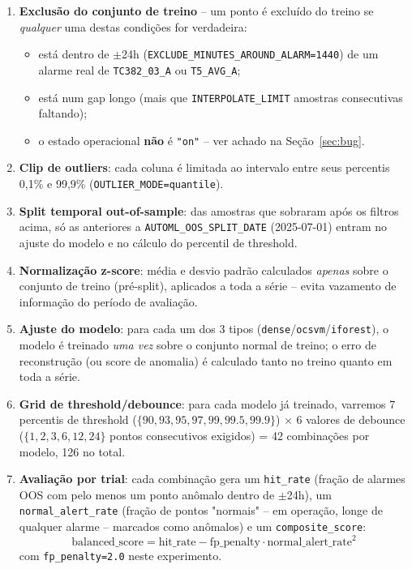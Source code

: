 \documentclass[11pt,a4paper]{article}
\begin{document}
\begin{enumerate}[leftmargin=*]
\item \textbf{Exclusão do conjunto de treino} -- um ponto é excluído do
  treino se \emph{qualquer} uma destas condições for verdadeira:
  \begin{itemize}
    \item está dentro de $\pm$24h (\texttt{EXCLUDE\_MINUTES\_AROUND\_ALARM=1440})
          de um alarme real de \texttt{TC382\_03\_A} ou \texttt{T5\_AVG\_A};
    \item está num gap longo (mais que \texttt{INTERPOLATE\_LIMIT} amostras
          consecutivas faltando);
    \item o estado operacional \textbf{não} é \texttt{"on"} -- ver achado
          na Seção~\ref{sec:bug}.
  \end{itemize}

\item \textbf{Clip de outliers}: cada coluna é limitada ao intervalo entre
  seus percentis 0,1\% e 99,9\% (\texttt{OUTLIER\_MODE=quantile}).

\item \textbf{Split temporal out-of-sample}: das amostras que sobraram após
  os filtros acima, só as anteriores a \texttt{AUTOML\_OOS\_SPLIT\_DATE}
  (2025-07-01) entram no ajuste do modelo e no cálculo do percentil de
  threshold.

\item \textbf{Normalização z-score}: média e desvio padrão calculados
  \emph{apenas} sobre o conjunto de treino (pré-split), aplicados a toda a
  série -- evita vazamento de informação do período de avaliação.

\item \textbf{Ajuste do modelo}: para cada um dos 3 tipos
  (\texttt{dense}/\texttt{ocsvm}/\texttt{iforest}), o modelo é treinado
  \emph{uma vez} sobre o conjunto normal de treino; o erro de reconstrução
  (ou score de anomalia) é calculado tanto no treino quanto em toda a
  série.

\item \textbf{Grid de threshold/debounce}: para cada modelo já treinado,
  varremos 7 percentis de threshold ($\{90, 93, 95, 97, 99, 99.5, 99.9\}$)
  $\times$ 6 valores de debounce ($\{1, 2, 3, 6, 12, 24\}$ pontos
  consecutivos exigidos) = 42 combinações por modelo, 126 no total.

\item \textbf{Avaliação por trial}: cada combinação gera um
  \texttt{hit\_rate} (fração de alarmes OOS com pelo menos um ponto anômalo
  dentro de $\pm$24h), um \texttt{normal\_alert\_rate} (fração de pontos
  "normais" -- em operação, longe de qualquer alarme -- marcados como
  anômalos) e um \texttt{composite\_score}:
  \[
  \text{balanced\_score} = \text{hit\_rate} - \text{fp\_penalty} \cdot \text{normal\_alert\_rate}^2
  \]
  com \texttt{fp\_penalty=2.0} neste experimento.


\end{enumerate}
\end{document}
